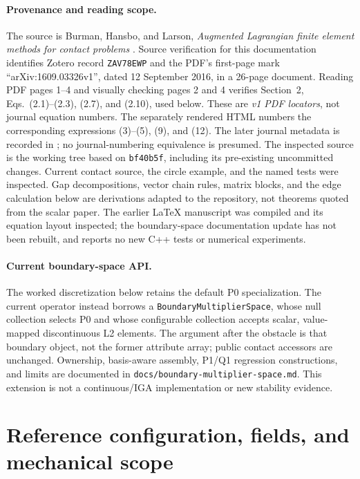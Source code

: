 \documentclass[preprint,11pt]{elsarticle}
\numberwithin{equation}{section}
\newcommand{\code}[1]{\texttt{\nolinkurl{#1}}}
\begin{document}
\paragraph{Provenance and reading scope.}
The source is Burman, Hansbo, and Larson,
\emph{Augmented Lagrangian finite element methods for contact problems}
\cite{BHLv1}. Source verification for this documentation
identifies Zotero record \code{ZAV78EWP} and the PDF's first-page mark
``arXiv:1609.03326v1'', dated 12 September 2016, in a 26-page document.
Reading PDF pages 1--4 and visually checking pages 2 and 4 verifies Section~2,
Eqs.~(2.1)--(2.3), (2.7), and (2.10), used below.
These are \emph{v1 PDF locators}, not journal equation numbers.
The separately rendered HTML numbers the corresponding expressions
(3)--(5), (9), and (12). The later journal metadata is recorded in
\cite{BHLjournal}; no journal-numbering equivalence is presumed.
The inspected source is the working tree based on \code{bf40b5f}, including
its pre-existing uncommitted changes. Current contact source, the circle
example, and the named tests were inspected. Gap decompositions, vector chain rules, matrix
blocks, and the edge calculation below are derivations adapted to the
repository, not theorems quoted from the scalar paper. The earlier \LaTeX{}
manuscript was compiled and its equation layout inspected; the boundary-space
documentation update has not been rebuilt, and reports no new C++ tests or
numerical experiments.

\paragraph{Current boundary-space API.}
The worked discretization below retains the default P0 specialization.
The current operator instead borrows a \code{BoundaryMultiplierSpace}, whose
null collection selects P0 and whose configurable collection accepts scalar,
value-mapped discontinuous L2 elements. The argument after the obstacle is
that boundary object, not the former attribute array; public contact accessors
are unchanged. Ownership, basis-aware assembly, P1/Q1 regression constructions,
and limits are documented in \code{docs/boundary-multiplier-space.md}.
This extension is not a continuous/IGA implementation or new stability evidence.

\section{Reference configuration, fields, and mechanical scope}
\label{sec:scope}
\end{document}
